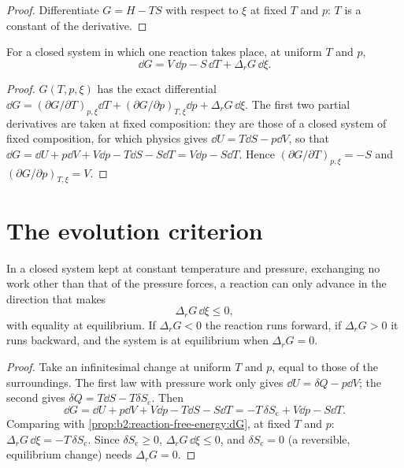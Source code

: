 \begin{proof}
Differentiate $G = H - TS$ with respect to $\xi$ at fixed $T$ and $p$: $T$
is a constant of the derivative.
\end{proof}

\begin{proposition}\label{prop:b2:reaction-free-energy:dG}
For a closed system in which one reaction takes place, at uniform $T$ and
$p$,
\[
  \dd G = V\,\dd p - S\,\dd T + \Delta_r G\,\dd\xi .
\]
\end{proposition}

\begin{proof}
$G(T, p, \xi)$ has the exact differential $\dd G = (\partial G/\partial
T)_{p,\xi}\dd T + (\partial G/\partial p)_{T,\xi}\dd p + \Delta_r G\,\dd\xi$.
The first two partial derivatives are taken at fixed composition: they are
those of a closed system of fixed composition, for which physics gives
$\dd U = T\dd S - p\dd V$, so that $\dd G = \dd U + p\dd V + V\dd p - T\dd S
- S\dd T = V\dd p - S\dd T$. Hence $(\partial G/\partial T)_{p,\xi} = -S$
and $(\partial G/\partial p)_{T,\xi} = V$.
\end{proof}

\section{The evolution criterion}

\begin{theorem}\label{thm:b2:reaction-free-energy:evolution}
In a closed system kept at constant temperature and pressure, exchanging no
work other than that of the pressure forces, a reaction can only advance in
the direction that makes
\[
  \Delta_r G\,\dd\xi \leq 0 ,
\]
with equality at equilibrium. If $\Delta_r G < 0$ the reaction runs
forward, if $\Delta_r G > 0$ it runs backward, and the system is at
equilibrium when $\Delta_r G = 0$.
\end{theorem}

\begin{proof}
Take an infinitesimal change at uniform $T$ and $p$, equal to those of the
surroundings. The first law with pressure work only gives $\dd U = \delta Q
- p\dd V$; the second gives $\delta Q = T\dd S - T\delta S_{\text{c}}$. Then
\[
  \dd G = \dd U + p\dd V + V\dd p - T\dd S - S\dd T = -T\,\delta
  S_{\text{c}} + V\dd p - S\dd T .
\]
Comparing with \cref{prop:b2:reaction-free-energy:dG}, at fixed $T$ and $p$:
$\Delta_r G\,\dd\xi = -T\,\delta S_{\text{c}}$. Since $\delta S_{\text{c}}
\geq 0$, $\Delta_r G\,\dd\xi \leq 0$, and $\delta S_{\text{c}} = 0$ (a
reversible, equilibrium change) needs $\Delta_r G = 0$.
\end{proof}


